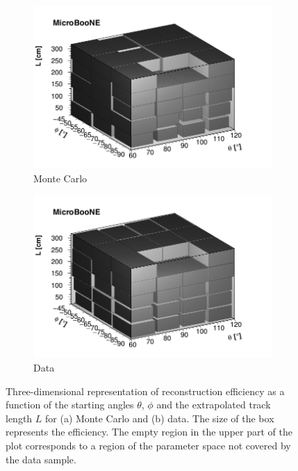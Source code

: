 \documentclass[a4paper,11pt]{article}
\begin{document}
\begin{figure}[htbp]
  \begin{subfigure}{0.495\textwidth}
    \includegraphics[width=\linewidth]{figures/3d_mc.png}
    \caption{Monte Carlo} \label{fig:3d_mc}
  \end{subfigure}
  \begin{subfigure}{0.495\textwidth}
    \includegraphics[width=\linewidth]{figures/3d_data.png}
    \caption{Data} \label{fig:3d_data}
  \end{subfigure}
  \caption{Three-dimensional representation of reconstruction efficiency as a function of the starting angles $\theta$, $\phi$ and the extrapolated track length $L$ for (a) Monte Carlo and (b) data. The size of the box represents the efficiency. The empty region in the upper part of the plot corresponds to a region of the parameter space not covered by the data sample.}\label{fig:3d}
\end{figure}
\end{document}
